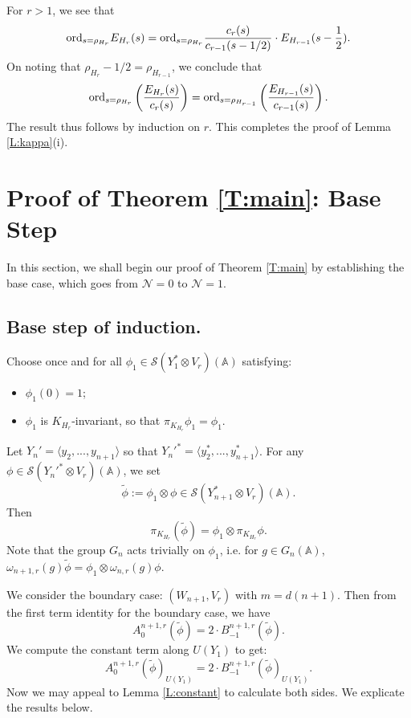 \documentclass[10pt]{amsart}
\theoremstyle{plain}
\numberwithin{equation}{section}
\begin{document}
  For $r>1$, we see that 
  \[  {\rm ord}_{s = \rho_{H_r}} E_{H_r}(s)  =  {\rm ord}_{s = \rho_{H_r}}  \frac{c_r(s)}{c_{r-1}(s- 1/2)} \cdot E_{H_{r-1}}(s - \frac{1}{2}). \]
  On noting that $\rho_{H_r} - 1/2 = \rho_{H_{r-1}}$, we conclude  that
 \[  {\rm ord}_{s = \rho_{H_r}} \left( \frac{E_{H_r}(s)}{c_r(s)}  \right)  =  {\rm ord}_{s = \rho_{H_{r-1}}}\left(
  \frac{E_{H_{r-1}}(s)}{c_{r-1}(s)}  \right).  \]
  The result thus follows by induction on $r$. This completes the proof of Lemma
 \ref{L:kappa}(i).
 \vskip 15pt
 
 \section{\bf Proof of  Theorem \ref{T:main}: Base Step}
 
 In this section, we shall begin our proof of Theorem \ref{T:main} by
 establishing the base case, which goes from $\mathcal{N} = 0$ to
 $\mathcal{N} = 1$. 
 
 \subsection{\bf Base step of induction.}  \label{SS:base}
 Choose once and for all $\phi_1\in \mathcal{S}(Y_1^* \otimes
 V_r)({\mathbb{A}})$ satisfying:
 \vskip 5pt
 
 \begin{itemize}
 \item $\phi_1(0) = 1$;
 \item $\phi_1$ is $K_{H_r}$-invariant, so that $\pi_{K_{H_r}} \phi_1 = \phi_1$. 
 \end{itemize}
 \vskip 5pt
 
 Let $Y_n' = \langle y_2, ...,y_{n+1} \rangle$ so that ${Y_n'}^* = \langle y_2^*,...,y_{n+1}^* \rangle$.
 For any $\phi \in \mathcal{S}({Y_n'}^* \otimes V_r)({\mathbb{A}})$, we set
 \[  \tilde{\phi} := \phi_1 \otimes \phi \in \mathcal{S}(Y_{n+1}^*
 \otimes V_r)({\mathbb{A}}). \]
 Then 
 \[  \pi_{K_{H_r}}(\tilde{\phi}) = \phi_1 \otimes \pi_{K_{H_r}}
 \phi. \]
Note that the group $G_n$ acts trivially on $\phi_1$, i.e. for
$g\in G_n({\mathbb{A}})$,
$\omega_{n+1,r}(g)\tilde{\phi}=\phi_1\otimes\omega_{n,r}(g)\phi$.
\vskip 5pt

 We consider the boundary case: $(W_{n+1}, V_r)$ with $m =
 d(n+1)$. Then from the first term identity for the boundary case, we
 have
 \[   A^{n+1,r}_{0}(\tilde{\phi}) = 2 \cdot
 B_{-1}^{n+1, r}(\tilde{\phi}).   \]
 We compute the constant term along $U(Y_1)$ to get:
  \begin{equation}  \label{E:compare}
   A^{n+1,r}_0(\tilde{\phi})_{U(Y_1)} = 2 \cdot
   B^{n+1,r}_{-1}(\tilde{\phi})_{U(Y_1)}. 
\end{equation}
 Now we may appeal to Lemma \ref{L:constant} to calculate both
 sides. We explicate the results below.
  \vskip 5pt
  
\end{document}
